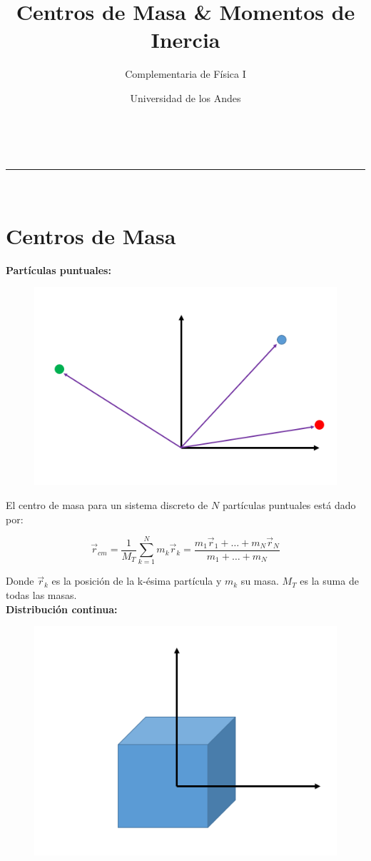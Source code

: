 \documentclass[a4paper,11pt]{article}
\makeatletter
\newcommand{\linia}{\rule{\linewidth}{0.5pt}}
\theoremstyle{mytheor}
\renewcommand{\maketitle}{
\begin{center}
\vspace{2ex}
{\huge \textsc{\@title}}
\vspace{1ex}
\\
\linia\\
\@author \hfill \@date
\vspace{4ex}
\end{center}
}
\makeatother
\begin{document}
\title{ Centros de Masa \& Momentos de Inercia}

\author{Complementaria de Física I}

\date{ Universidad de los Andes}

\maketitle

\section{Centros de Masa}

\textbf{Partículas puntuales:}


\begin{figure}[h]
	\includegraphics[width=0.5\linewidth]{masaspuntuales}
	\label{fcN4}
\end{figure}

El centro de masa para un sistema discreto de $N$ partículas puntuales  está dado por:

$$ \vec{r}_{cm} = \frac{1}{M_{T}}\sum_{k=1}^{N} m_k \vec{r}_k = \frac{m_1\vec{r}_1 + \dots + m_N \vec{r}_N}{m_1 + \dots + m_N}$$


Donde $ \vec{r}_k$ es la posición de la k-ésima partícula y $m_k$ su masa. $M_T$ es la suma de todas las masas.\\

\textbf{Distribución continua:}

\begin{figure}[h]
	\includegraphics[width=0.5\linewidth]{3d}
	\label{fcN4}
\end{figure}
\end{document}
